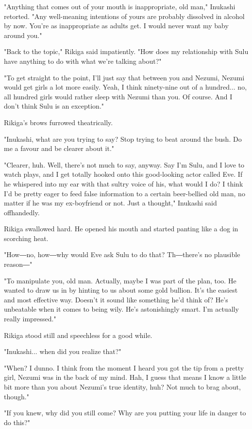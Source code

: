 "Anything that comes out of your mouth is inappropriate, old man,"
Inukashi retorted. "Any well-meaning intentions of yours are probably
dissolved in alcohol by now. You're as inappropriate as adults get. I
would never want my baby around you."

"Back to the topic," Rikiga said impatiently. "How does my relationship
with Sulu have anything to do with what we're talking about?"

"To get straight to the point, I'll just say that between you and
Nezumi, Nezumi would get girls a lot more easily. Yeah, I think
ninety-nine out of a hundred... no, all hundred girls would rather sleep
with Nezumi than you. Of course. And I don't think Sulu is an
exception."

Rikiga's brows furrowed theatrically.

"Inukashi, what are you trying to say? Stop trying to beat around the
bush. Do me a favour and be clearer about it."

"Clearer, huh. Well, there's not much to say, anyway. Say I'm Sulu, and
I love to watch plays, and I get totally hooked onto this good-looking
actor called Eve. If he whispered into my ear with that sultry voice of
his, what would I do? I think I'd be pretty eager to feed false
information to a certain beer-bellied old man, no matter if he was my
ex-boyfriend or not. Just a thought," Inukashi said offhandedly.

Rikiga swallowed hard. He opened his mouth and started panting like a
dog in scorching heat.

"How―no, how―why would Eve ask Sulu to do that? Th―there's no plausible
reason―"

"To manipulate you, old man. Actually, maybe I was part of the plan,
too. He wanted to draw us in by hinting to us about some gold bullion.
It's the easiest and most effective way. Doesn't it sound like something
he'd think of? He's unbeatable when it comes to being wily. He's
astonishingly smart. I'm actually really impressed."

Rikiga stood still and speechless for a good while.

"Inukashi... when did you realize that?"

"When? I dunno. I think from the moment I heard you got the tip from a
pretty girl, Nezumi was in the back of my mind. Hah, I guess that means
I know a little bit more than you about Nezumi's true identity, huh? Not
much to brag about, though."

"If you knew, why did you still come? Why are you putting your life in
danger to do this?"

